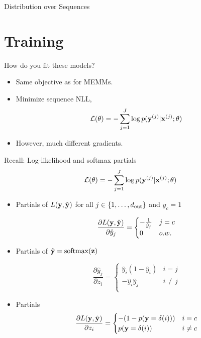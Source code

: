 \documentclass{beamer}
\begin{document}
\begin{frame}{Distribution over Sequences}
 \section{Training}

 \begin{frame}{How do you fit these models?}
   \begin{itemize}
   \item Same objective as for MEMMs.
     
     \air

   \item Minimize sequence NLL,
     \[ \mathcal{L}(\theta) =  - \sum_{ j=1}^J  \log p(\mathbf{y}^{(j)} | \mathbf{x}^{(j)}; \theta) \]
 
     \air 

   \item However, much different gradients.

   \end{itemize}

 \end{frame}


 \begin{frame}{Recall: Log-likelihood and softmax partials}
     \[ \mathcal{L}(\theta) =  - \sum_{ j=1}^J  \log p(\mathbf{y}^{(j)} | \mathbf{x}^{(j)}; \theta) \]

     \begin{itemize}
     \item 

     Partials of $L(\mathbf{y}, \hat{\mathbf{y}})$ for all $j \in \{1, \ldots, {d_{\mathrm{out}}}\}$ and $y_c = 1$

     \[ \frac{\partial L(\mathbf{y}, \hat{\mathbf{y}})}{\partial \hat{y}_j} = \begin{cases}-\frac{1} {\hat{y}_j} & j = c\\ 0 & o.w. \end{cases}  \]

     \item 
    Partials of $\hat{\boldy} = \softmax(\boldz)$

  \[ \frac{\partial \hat{y}_j }{\partial z_i} =
    \begin{cases}
      \hat{y}_i (1 - \hat{y}_i) & i = j\\
      - \hat{y}_i \hat{y}_j & i \neq j \\
    \end{cases} \]

  \item Partials
  \[ \frac{\partial L(\mathbf{y}, \hat{\mathbf{y}}) }{\partial z_i} =
    \begin{cases}
     -(1 - p(\mathbf{y} = \delta(i))) & i = c\\
      p(\mathbf{y} = \delta(i))  & i \neq c \\
    \end{cases} \]


\end{itemize}
\end{frame}
\end{frame}
\end{document}
